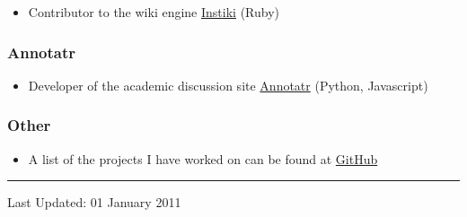 \documentclass{article}
\begin{document}
\begin{itemize}%
\item Contributor to the wiki engine \href{http://www.instiki.org/}{Instiki} (Ruby)

\end{itemize}
\hypertarget{annotatr}{}\subsubsection*{{Annotatr}}\label{annotatr}

\begin{itemize}%
\item Developer of the academic discussion site \href{http://annotatr.appspot.com/}{Annotatr} (Python, Javascript)

\end{itemize}
\hypertarget{other}{}\subsubsection*{{Other}}\label{other}

\begin{itemize}%
\item A list of the projects I have worked on can be found at \href{https://github.com/mreid}{GitHub}

\end{itemize}

\vspace{.5em} \hrule \vspace{.5em}
Last Updated: 01 January 2011
\end{document}
